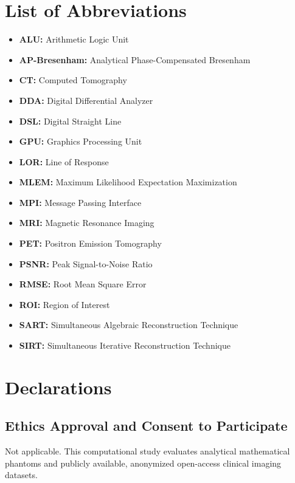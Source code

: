 \documentclass[11pt]{article}
\begin{document}
\section*{List of Abbreviations}
\begin{itemize}
    \item \textbf{ALU:} Arithmetic Logic Unit
    \item \textbf{AP-Bresenham:} Analytical Phase-Compensated Bresenham
    \item \textbf{CT:} Computed Tomography
    \item \textbf{DDA:} Digital Differential Analyzer
    \item \textbf{DSL:} Digital Straight Line
    \item \textbf{GPU:} Graphics Processing Unit
    \item \textbf{LOR:} Line of Response
    \item \textbf{MLEM:} Maximum Likelihood Expectation Maximization
    \item \textbf{MPI:} Message Passing Interface
    \item \textbf{MRI:} Magnetic Resonance Imaging
    \item \textbf{PET:} Positron Emission Tomography
    \item \textbf{PSNR:} Peak Signal-to-Noise Ratio
    \item \textbf{RMSE:} Root Mean Square Error
    \item \textbf{ROI:} Region of Interest
    \item \textbf{SART:} Simultaneous Algebraic Reconstruction Technique
    \item \textbf{SIRT:} Simultaneous Iterative Reconstruction Technique
\end{itemize}

\section*{Declarations}

\subsection*{Ethics Approval and Consent to Participate}
Not applicable. This computational study evaluates analytical mathematical phantoms and publicly available, anonymized open-access clinical imaging datasets.
\end{document}
